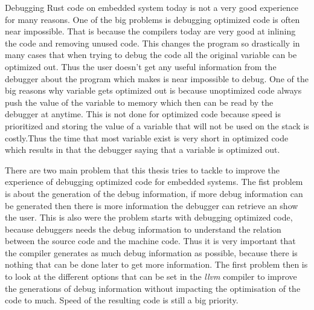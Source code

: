  


Debugging Rust code on embedded system today is not a very good experience for many reasons.
One of the big problems is debugging optimized code is often near impossible.
That is because the compilers today are very good at inlining the code and removing unused code.
This changes the program so drastically in many cases that when trying to debug the code all the original variable can be optimized out.
Thus the user doesn't get any useful information from the debugger about the program which makes is near impossible to debug.
One of the big reasons why variable gets optimized out is because unoptimized code always push the value of the variable to memory which then can be read by the debugger at anytime.
This is not done for optimized code because speed is prioritized and storing the value of a variable that will not be used on the stack is costly.Thus the time that most variable exist is very short in optimized code which results in that the debugger saying that a variable is optimized out.




There are two main problem that this thesis tries to tackle to improve the experience of debugging optimized code for embedded systems.
The fist problem is about the generation of the debug information, if more debug information can be generated then there is more information the debugger can retrieve an show the user.
This is also were the problem starts with debugging optimized code, because debuggers needs the debug information to understand the relation between the source code and the machine code.
Thus it is very important that the compiler generates as much debug information as possible, because there is nothing that can be done later to get more information.
The first problem then is to look at the different options that can be set in the \emph{llvm} compiler to improve the generations of debug information without impacting the optimisation of the code to much.
Speed of the resulting code is still a big priority.


